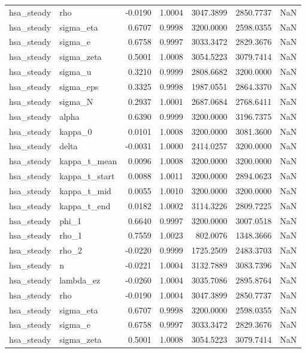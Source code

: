 \begin{tabular}{llrrrrl}
hsa\_steady & rho & -0.0190 & 1.0004 & 3047.3899 & 2850.7737 & NaN \\
hsa\_steady & sigma\_eta & 0.6707 & 0.9998 & 3200.0000 & 2598.0355 & NaN \\
hsa\_steady & sigma\_e & 0.6758 & 0.9997 & 3033.3472 & 2829.3676 & NaN \\
hsa\_steady & sigma\_zeta & 0.5001 & 1.0008 & 3054.5223 & 3079.7414 & NaN \\
hsa\_steady & sigma\_u & 0.3210 & 0.9999 & 2808.6682 & 3200.0000 & NaN \\
hsa\_steady & sigma\_eps & 0.3325 & 0.9998 & 1987.0551 & 2864.3370 & NaN \\
hsa\_steady & sigma\_N & 0.2937 & 1.0001 & 2687.0684 & 2768.6411 & NaN \\
hsa\_steady & alpha & 0.6390 & 0.9999 & 3200.0000 & 3196.7375 & NaN \\
hsa\_steady & kappa\_0 & 0.0101 & 1.0008 & 3200.0000 & 3081.3600 & NaN \\
hsa\_steady & delta & -0.0031 & 1.0000 & 2414.0257 & 3200.0000 & NaN \\
hsa\_steady & kappa\_t\_mean & 0.0096 & 1.0008 & 3200.0000 & 3200.0000 & NaN \\
hsa\_steady & kappa\_t\_start & 0.0088 & 1.0011 & 3200.0000 & 2894.0623 & NaN \\
hsa\_steady & kappa\_t\_mid & 0.0055 & 1.0010 & 3200.0000 & 3200.0000 & NaN \\
hsa\_steady & kappa\_t\_end & 0.0182 & 1.0002 & 3114.3226 & 2809.7225 & NaN \\
hsa\_steady & phi\_1 & 0.6640 & 0.9997 & 3200.0000 & 3007.0518 & NaN \\
hsa\_steady & rho\_1 & 0.7559 & 1.0023 & 802.0076 & 1348.3666 & NaN \\
hsa\_steady & rho\_2 & -0.0220 & 0.9999 & 1725.2509 & 2483.3703 & NaN \\
hsa\_steady & n & -0.0221 & 1.0004 & 3132.7889 & 3083.7396 & NaN \\
hsa\_steady & lambda\_ez & -0.0260 & 1.0004 & 3035.7086 & 2895.8764 & NaN \\
hsa\_steady & rho & -0.0190 & 1.0004 & 3047.3899 & 2850.7737 & NaN \\
hsa\_steady & sigma\_eta & 0.6707 & 0.9998 & 3200.0000 & 2598.0355 & NaN \\
hsa\_steady & sigma\_e & 0.6758 & 0.9997 & 3033.3472 & 2829.3676 & NaN \\
hsa\_steady & sigma\_zeta & 0.5001 & 1.0008 & 3054.5223 & 3079.7414 & NaN \\

\end{tabular}
